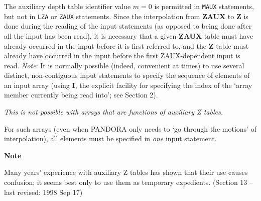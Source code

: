 The auxiliary depth table identifier value $m = 0$ is permitted in
{\tt MAUX} statements, but not in {\tt LZA} or {\tt ZAUX} statements.
\blankline
Since the interpolation from {\bf ZAUX} to {\bf Z} is done during the
reading of the input statements (as opposed to being done after all the
input has been read), it is necessary that a given {\bf ZAUX} table
must have already occurred in the input before it is first referred to,
and the {\bf Z} table must already have occurred in the input before
the first ZAUX-dependent input is read.
\blankline
\blankline
{\it Note}: It is normally possible (indeed, convenient at times)
to use several distinct, non-contiguous input statements to specify
the sequence of elements of an input array (using {\bf I}, the
explicit facility for specifying the index of the `array member
currently being read into'; see Section 2). 

{\it This is not possible with arrays that are functions of 
auxiliary Z tables.} 

For such arrays (even when PANDORA only needs to `go through the 
motions' of interpolation), all elements must be specified in 
{\it one} input statement.
\blankline
\blankline
\centerline{{\bf Note}}
\noindent Many years' experience with auxiliary Z tables
has shown that their use causes confusion; it seems best only to
use them as temporary expedients.
\blankline
\vfill
\noindent (Section 13 -- last revised: 1998 Sep 17) \par
{}
\ej
